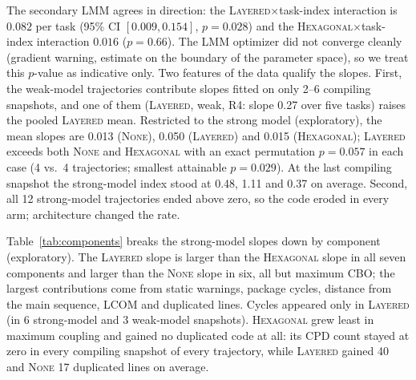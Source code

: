 \documentclass[10pt]{article}
\newcommand{\NONE}{\textsc{None}}
\newcommand{\LAY}{\textsc{Layered}}
\newcommand{\HEX}{\textsc{Hexagonal}}
\begin{document}
The secondary LMM agrees in direction: the \LAY$\times$task-index interaction is $0.082$ per task
(95\% CI $[0.009, 0.154]$, $p=0.028$) and the \HEX$\times$task-index interaction $0.016$
($p=0.66$). The LMM optimizer did not converge cleanly (gradient warning, estimate on the boundary
of the parameter space), so we treat this $p$-value as indicative only. Two features of the data
qualify the slopes. First, the weak-model trajectories contribute slopes fitted on only 2--6
compiling snapshots, and one of them (\LAY, weak, R4: slope 0.27 over five tasks) raises the
pooled \LAY{} mean. Restricted to the strong model (exploratory), the mean slopes are 0.013
(\NONE), 0.050 (\LAY) and 0.015 (\HEX); \LAY{} exceeds both \NONE{} and \HEX{} with an exact
permutation $p=0.057$ in each case (4 vs.\ 4 trajectories; smallest attainable $p=0.029$). At the
last compiling snapshot the strong-model index stood at 0.48, 1.11 and 0.37 on average. Second,
all 12 strong-model trajectories ended above zero, so the code eroded in every arm; architecture
changed the rate.

Table~\ref{tab:components} breaks the strong-model slopes down by component (exploratory). The
\LAY{} slope is larger than the \HEX{} slope in all seven components and larger than the \NONE{}
slope in six, all but maximum CBO; the largest contributions come from static warnings, package
cycles, distance from the main sequence, LCOM and duplicated lines. Cycles appeared only in
\LAY{} (in 6 strong-model and 3 weak-model snapshots). \HEX{} grew least in maximum coupling and
gained no duplicated code at all: its CPD count stayed at zero in every compiling snapshot of every
trajectory, while \LAY{} gained 40 and \NONE{} 17 duplicated lines on average.
\end{document}
